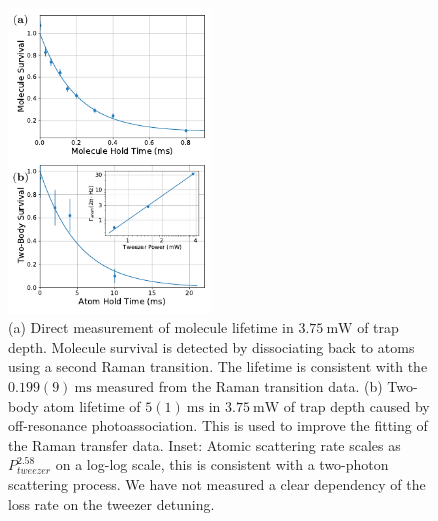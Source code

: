 \documentclass[aps,prl,twocolumn,10pt,superscriptaddress]{revtex4-1}
\begin{document}


\begin{figure}[t!]
  \includegraphics[width=0.48\textwidth]{fig3.pdf}
  \caption{
    (a) Direct measurement of molecule lifetime in $3.75~\mathrm{mW}$ of trap depth.
    Molecule survival is detected by dissociating back to atoms using a second Raman transition.
    The lifetime is consistent with the $0.199(9)~\mathrm{ms}$
    measured from the Raman transition data.
    (b) Two-body atom lifetime of $5(1)~\mathrm{ms}$
    in $3.75~\mathrm{mW}$ of trap depth caused by off-resonance photoassociation.
    This is used to improve the fitting of the Raman transfer data.
    Inset: Atomic scattering rate scales as $P_{tweezer}^{2.58}$ on a log-log scale,
    this is consistent with a two-photon scattering process.
    We have not measured a clear dependency of the loss rate on the tweezer detuning.
    \label{f-lifetime}}
\end{figure}
\end{document}
